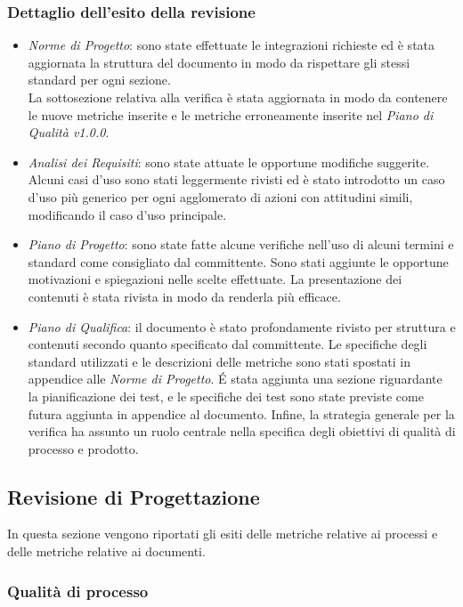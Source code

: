 \subsubsection{Dettaglio dell'esito della revisione}
\begin{itemize}
	\item\emph{Norme di Progetto}: sono state effettuate le integrazioni richieste ed è stata aggiornata la struttura del documento in modo da rispettare gli stessi standard per ogni sezione.\\
	La sottosezione relativa alla verifica è stata aggiornata in modo da contenere le nuove metriche inserite e le metriche erroneamente inserite nel \emph{Piano di Qualità v1.0.0}.	\item\emph{Analisi dei Requisiti}: sono state attuate le opportune modifiche suggerite. Alcuni casi d'uso sono stati leggermente rivisti ed è stato introdotto un caso d'uso più generico per ogni agglomerato di azioni con attitudini simili, modificando il caso d'uso principale. 	
	\item\emph{Piano di Progetto}: sono state fatte alcune verifiche nell'uso di alcuni termini e standard come consigliato dal committente. Sono stati aggiunte le opportune motivazioni e spiegazioni nelle scelte effettuate. La presentazione dei contenuti è stata rivista in modo da renderla più efficace.
	\item\emph{Piano di Qualifica}: il documento è stato profondamente rivisto per struttura e contenuti secondo quanto specificato dal committente.
	Le specifiche degli standard utilizzati e le descrizioni delle metriche sono stati spostati in appendice alle \emph{Norme di Progetto}. É stata aggiunta una sezione riguardante la pianificazione dei test, e le specifiche dei test sono state previste come futura aggiunta in appendice al documento. Infine, la strategia generale per la verifica ha assunto un ruolo centrale nella specifica degli obiettivi di qualità di processo e prodotto. 
\end{itemize}

\subsection{Revisione di Progettazione}
In questa sezione vengono riportati gli esiti delle metriche relative ai processi e delle metriche relative ai documenti.

\subsubsection{Qualità di processo}
